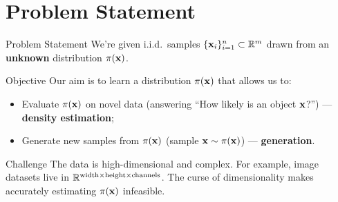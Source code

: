 \documentclass{beamer}
\begin{document}
\section{Problem Statement}
\begin{frame}{Problem Statement}
	We're given i.i.d.\ samples $\{\mathbf{x}_i\}_{i=1}^n \subset \mathbb{R}^m$ drawn from an \textbf{unknown} distribution $\pi(\mathbf{x})$.
	
	\begin{block}{Objective}
		Our aim is to learn a distribution $\pi(\mathbf{x})$ that allows us to: 
		\begin{itemize}
		    \item Evaluate $\pi(\mathbf{x})$ on novel data (answering ``How likely is an object $\mathbf{x}$?'') --- \textbf{density estimation}; 
		    \item Generate new samples from $\pi(\mathbf{x})$ (sample $\mathbf{x} \sim \pi(\mathbf{x})$) --- \textbf{generation}.
		\end{itemize}
	\end{block}
	\begin{block}{Challenge}
		The data is high-dimensional and complex. For example, image datasets live in $\mathbb{R}^{\text{width} \times \text{height} \times \text{channels}}$. The curse of dimensionality makes accurately estimating $\pi(\mathbf{x})$ infeasible.
	\end{block}
\end{frame}
\end{document}
